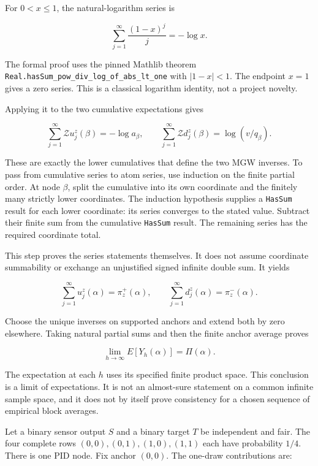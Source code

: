For \(0<x\le1\), the natural-logarithm series is

\[
\sum_{j=1}^{\infty}\frac{(1-x)^j}{j}=-\log x.
\]

The formal proof uses the pinned Mathlib theorem \texttt{Real.hasSum\_pow\_div\_log\_of\_abs\_lt\_one} with \(|1-x|<1\). The endpoint \(x=1\) gives a zero series. This is a classical logarithm identity, not a project novelty.

Applying it to the two cumulative expectations gives

\[
\sum_{j=1}^{\infty}\mathcal Zu_j^z(\beta)=-\log a_\beta,
\qquad
\sum_{j=1}^{\infty}\mathcal Zd_j^z(\beta)=\log(v/q_\beta).
\]

These are exactly the lower cumulatives that define the two MGW inverses. To pass from cumulative series to atom series, use induction on the finite partial order. At node \(\beta\), split the cumulative into its own coordinate and the finitely many strictly lower coordinates. The induction hypothesis supplies a \texttt{HasSum} result for each lower coordinate: its series converges to the stated value. Subtract their finite sum from the cumulative \texttt{HasSum} result. The remaining series has the required coordinate total.

This step proves the series statements themselves. It does not assume coordinate summability or exchange an unjustified signed infinite double sum. It yields

\[
\sum_{j=1}^{\infty}u_j^z(\alpha)=\pi_z^+(\alpha),
\qquad
\sum_{j=1}^{\infty}d_j^z(\alpha)=\pi_z^-(\alpha).
\]

Choose the unique inverses on supported anchors and extend both by zero elsewhere. Taking natural partial sums and then the finite anchor average proves

\[
\lim_{h\to\infty} E[Y_h(\alpha)]=\Pi(\alpha).
\]

The expectation at each \(h\) uses its specified finite product space. This conclusion is a limit of expectations. It is not an almost-sure statement on a common infinite sample space, and it does not by itself prove consistency for a chosen sequence of empirical block averages.

\label{a-sensor-with-no-target-information-can-give-a-positive-short-prefix-mean}

Let a binary sensor output \(S\) and a binary target \(T\) be independent and fair. The four complete rows \((0,0),(0,1),(1,0),(1,1)\) each have probability \(1/4\). There is one PID node. Fix anchor \((0,0)\). The one-draw contributions are:


